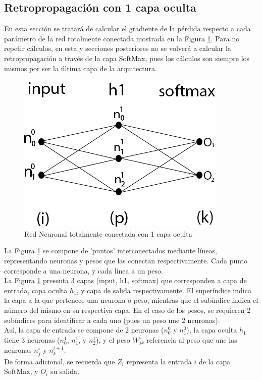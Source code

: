 \subsection{Retropropagación con 1 capa oculta \cite{NN_backpropagation} \cite{NN_backprop_2} \label{backprop_1_capa}}

En esta sección se tratará de calcular el gradiente de la pérdida respecto a cada parámetro de la red totalmente conectada mostrada en la Figura \ref{fig:nn_1_capa}. Para no repetir cálculos, en esta y secciones posteriores no se volverá a calcular la retropropagación a través de la capa SoftMax, pues los cálculos son siempre los mismos por ser la última capa de la arquitectura.

\begin{figure}[H]
	\centering
	\includegraphics[scale=0.35]{imagenes/nn_1_capa.jpg}  
	\caption{Red Neuronal totalmente conectada con 1 capa oculta}
	\label{fig:nn_1_capa}
\end{figure}

La Figura \ref{fig:nn_1_capa} se compone de 'puntos' interconectados mediante líneas, representando neuronas y pesos que las conectan respectivamente. Cada punto corresponde a una neurona, y cada línea a un peso. \\
La Figura \ref{fig:nn_1_capa} presenta 3 capas (input, h1, softmax) que corresponden a capa de entrada, capa oculta $h_1$, y capa de salida respectivamente. El superíndice indica la capa a la que pertenece una neurona o peso, mientras que el subíndice indica el número del mismo en su respectiva capa. En el caso de los pesos, se requieren 2 subíndices para identificar a cada uno (pues un peso une 2 neuronas). \\
Así, la capa de entrada se compone de 2 neuronas ($n^{0}_0$ y $n^{0}_1$), la capa oculta $h_1$ tiene 3 neuronas ($n^1_{0}$, $n^1_{1}$, y $n^1_{2}$), y el peso $W^{i}_{jk}$ referencia al peso que une las neuronas $n^{i}_j$ y $n^{i+1}_k$.\\
De forma adicional, se recuerda que $Z_i$ representa la entrada $i$ de la capa SoftMax, y $O_i$ su salida.  

